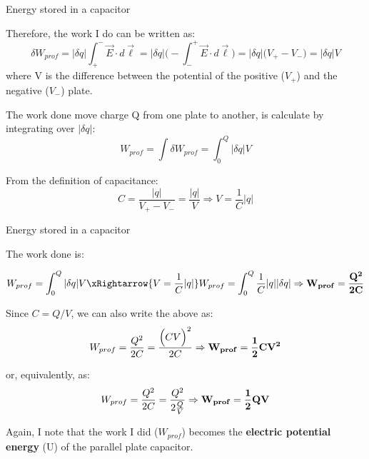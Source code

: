 \begin{frame}{Energy stored in a capacitor}

Therefore, the work I do can be written as:
\begin{equation*}
  {\delta}W_{prof} =
    |{\delta}q| \int_{+}^{-} \vec{E} \cdot d\vec{\ell} =
    |{\delta}q| \Big( - \int_{-}^{+} \vec{E} \cdot d\vec{\ell} \Big) =
    |{\delta}q| \Big(V_{+} - V_{-} \Big) =
    |{\delta}q| V
\end{equation*}
where V is the difference between the potential of the positive ($V_{+}$) and the negative ($V_{-}$) plate.

The work done move charge Q from one plate to another, is calculate by integrating over $|{\delta}q|$:
\begin{equation*}
  W_{prof} =
     \int {\delta}W_{prof} =
     \int_{0}^{Q}  |{\delta}q| V
\end{equation*}

From the definition of capacitance:
\begin{equation*}
  C = \frac{|q|}{V_{+} - V_{-}} = \frac{|q|}{V} \Rightarrow V = \frac{1}{C} |q|
\end{equation*}

\end{frame}

%
%
%

\begin{frame}{Energy stored in a capacitor}

The work done is:

\begin{equation*}
  W_{prof} = \int_{0}^{Q}  |{\delta}q| V \xRightarrow{V = \frac{1}{C} |q|}
  W_{prof} = \int_{0}^{Q}  \frac{1}{C} |q| |{\delta}q| \Rightarrow
  {\bf W_{prof} = \frac{Q^2}{2C} }
\end{equation*}

Since $C=Q/V$, we can also write the above as:
\begin{equation*}
  W_{prof} = \frac{Q^2}{2C} = \frac{\Big( C V \Big)^2 }{2C} \Rightarrow
  {\bf W_{prof} = \frac{1}{2} C V^2}
\end{equation*}

or, equivalently, as:
\begin{equation*}
  W_{prof} = \frac{Q^2}{2C} = \frac{Q^2}{2\frac{Q}{V}} \Rightarrow
  {\bf W_{prof} = \frac{1}{2} Q V}
\end{equation*}

Again, I note that the work I did ($W_{prof}$) becomes
the {\bf electric potential energy} (U) of the parallel plate capacitor.

\end{frame}

